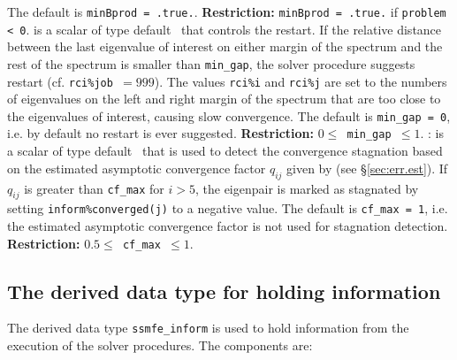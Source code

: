 \begin{description}
The default is {\tt minBprod = .true.}.
{\bf Restriction:} {\tt minBprod = .true.} if {\tt problem < 0}.
%
is a scalar of type default \Double\ that
controls the restart.
If the relative distance between the last eigenvalue of interest
on either margin of the spectrum and the rest of the spectrum
is smaller than {\tt min\_gap},
the solver procedure suggests restart
(cf. {\tt rci\%job $= 999$}).
The values 
{\tt rci\%i}
and
{\tt rci\%j}
are set to the numbers of eigenvalues on the left and right
margin of the spectrum that are too close to the eigenvalues
of interest, causing slow convergence.
The default is {\tt min\_gap = 0}, i.e.
by default no restart is ever suggested.
{\bf Restriction:} {\tt $0 \le$ min\_gap $\le 1$}.
%
:
is a scalar of type default \Double\ that
is used to detect the convergence stagnation
based on 
the estimated asymptotic convergence factor 
$q_{ij}$ given by 
(see \S\ref{sec:err.est}).
If $q_{ij}$ is greater than {\tt cf\_max} for $i > 5$,
the eigenpair is marked as stagnated by setting
{\tt inform\%converged(j)} to a negative value.
The default is {\tt cf\_max = 1}, i.e.
the estimated asymptotic convergence factor
is not used for stagnation detection.
{\bf Restriction:} {\tt $0.5 \le$ cf\_max $\le 1$}.
%
\end{description}

\subsection{The derived data type for holding information}

\label{sec:inform}

The derived data type {\tt ssmfe\_inform} is used
to hold information from the execution of
the solver procedures.
The components are:

